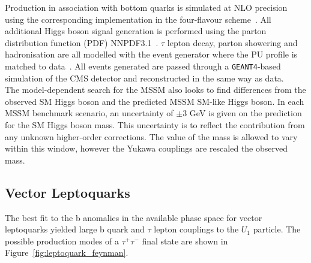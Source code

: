 Production in association with bottom quarks is simulated at NLO precision using the corresponding  implementation in the four-flavour scheme~\cite{Nason:2004rx,Frixione:2007vw,Alioli:2010xd,Jezo:2015aia}.
All additional Higgs boson signal generation is performed using the parton distribution function (PDF) NNPDF3.1~\cite{Ball:2014uwa,Ball:2017nwa}.
$\tau$ lepton decay, parton showering and hadronisation are all modelled with the \PYTHIA event generator where the PU profile is matched to data~\cite{Sirunyan:2019dfx,Sjostrand:2014zea}.
All events generated are passed through a \texttt{GEANT4}-based \cite{Agostinelli:2002hh} simulation of the CMS detector and reconstructed in the same way as data. \\

The model-dependent search for the MSSM also looks to find differences from the observed SM Higgs boson and the predicted MSSM SM-like Higgs boson.
In each MSSM benchmark scenario, an uncertainty of $\pm 3$ GeV is given on the prediction for the SM Higgs boson mass.
This uncertainty is to reflect the contribution from any unknown higher-order corrections.
The value of the mass is allowed to vary within this window, however the Yukawa couplings are rescaled the observed mass.

\subsection{Vector Leptoquarks}
\label{sec:vlq}

The best fit to the b anomalies in the available phase space for vector leptoquarks yielded large b quark and $\tau$ lepton couplings to the $U_1$ particle.
The possible production modes of a $\tau^+\tau^-$ final state are shown in Figure~\ref{fig:leptoquark_feynman}. \\

